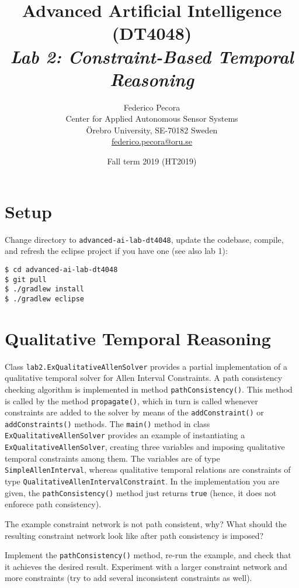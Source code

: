 \documentclass[a4paper]{article}
\title{Advanced Artificial Intelligence (DT4048)\\{\em Lab 2: Constraint-Based Temporal Reasoning}}
\author{Federico Pecora\\Center for Applied Autonomous Sensor Systems\\\"Orebro University, SE-70182 Sweden\\\url{federico.pecora@oru.se}}
\date{Fall term 2019 (HT2019)}
\begin{document}
\maketitle

\section{Setup}

Change directory to {\tt advanced-ai-lab-dt4048}, update the codebase, compile, and refresh the eclipse project if you have one (see also lab 1):

\begin{lstlisting}
$ cd advanced-ai-lab-dt4048
$ git pull
$ ./gradlew install
$ ./gradlew eclipse
\end{lstlisting}

\section{Qualitative Temporal Reasoning}

Class {\tt lab2.ExQualitativeAllenSolver} provides a partial implementation of a qualitative temporal solver for Allen Interval Constraints.  A path consistency checking algorithm is implemented in method {\tt pathConsistency()}.  This method is called by the method {\tt propagate()}, which in turn is called whenever constraints are added to the solver by means of the {\tt addConstraint()} or {\tt addConstraints()} methods. The {\tt main()} method in class {\tt ExQualitativeAllenSolver} provides an example of instantiating a {\tt ExQualitativeAllenSolver}, creating three variables and imposing qualitative temporal constraints among them.  The variables are of type {\tt SimpleAllenInterval}, whereas qualitative temporal relations are constraints of type {\tt QualitativeAllenIntervalConstraint}.  In the implementation you are given, the {\tt pathConsistency()} method just returns {\tt true} (hence, it does not enforece path consistency).

{\ex{}\label{ex:ex1}  The example constraint network is not path consistent, why? What should the resulting constraint network look like after path consistency is imposed?\vspace{0.1cm}}

{\ex{}\label{ex:ex2} Implement the {\tt pathConsistency()} method, re-run the example, and check that it achieves the desired result.  Experiment with a larger constraint network and more constraints (try to add several inconsistent constraints as well). \vspace{0.1cm}}
\end{document}
